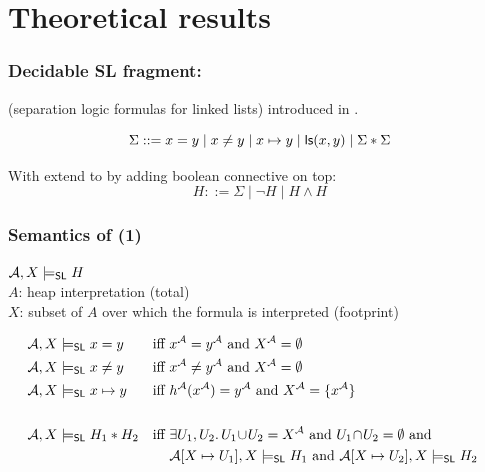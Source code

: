 \documentclass{beamer}
\begin{document}
\section{Theoretical results}

\begin{frame}
  \frametitle{Decidable SL fragment: \JoshLogic}

\JoshLogicSimple (separation logic formulas for linked lists) introduced in \cite{BerdineETAL04DecidableFragmentSeparationLogic}.

\vspace{2ex}

\JoshLogicSimple
\begin{equation*}
  \Sigma ::= x = y \mid x \neq y \mid x \mapsto y \mid \mathsf{ls}({x},{y}) \mid \Sigma * \Sigma
\end{equation*}

\vspace{2ex}

With extend \JoshLogicSimple to \JoshLogicSimple by adding boolean connective on top:
\begin{equation*}
  H ::= \Sigma \mid \neg H \mid H \land H
\end{equation*}

\end{frame}

\begin{frame}
  \frametitle{Semantics of \JoshLogic (1)}

${\mathcal{A}},{X} \models_{\mathsf{SL}} {H}$ \\
$A$: heap interpretation (total)\\
$X$: subset of $A$ over which the formula is interpreted (footprint)

\vspace{1ex}

{\small
\begin{align*}
 & {\mathcal{A}},{X} \models_{\mathsf{SL}} {x = y}&
\text{iff  }& x^{\mathcal{A}} = y^{\mathcal{A}} \text{ and } X^{\mathcal{A}} = \emptyset\\
 & {\mathcal{A}},{X} \models_{\mathsf{SL}} {x \neq y}&
\text{iff  }& x^{\mathcal{A}} \neq y^{\mathcal{A}} \text{ and } X^{\mathcal{A}} = \emptyset\\
 &{\mathcal{A}},{X} \models_{\mathsf{SL}} {x \mapsto y}&
\text{iff  }&  h^{\mathcal{A}}(x^{\mathcal{A}}) = y^{\mathcal{A}} \text{ and } X^{\mathcal{A}} = \{x^{\mathcal{A}}\}\\
 & & & & \\
 &{\mathcal{A}},{X} \models_{\mathsf{SL}} {H_1 * H_2}&
\text{iff  }& \exists U_1, U_2.\, U_1\!\cup\!U_2 = X^{\mathcal{A}} \text{ and } U_1\!\cap\!U_2 = \emptyset \text{ and} \\
  &  &  & {\mathcal{A}[X \mapsto U_1]},{X} \models_{\mathsf{SL}} {H_1} \text{ and } {\mathcal{A}[X \mapsto U_2]},{X} \models_{\mathsf{SL}} {H_2} \\ 
\end{align*}
}

\end{frame}
\end{document}

